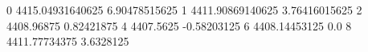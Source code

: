 0 4415.04931640625 6.90478515625
1 4411.90869140625 3.76416015625
2 4408.96875 0.82421875
4 4407.5625 -0.58203125
6 4408.14453125 0.0
8 4411.77734375 3.6328125

